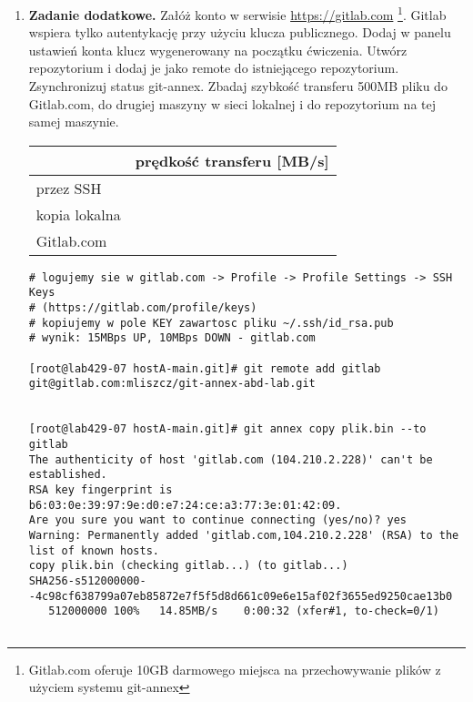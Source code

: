 \documentclass[polish]{article}
\newif\ifteacher
\begin{document}
\begin{enumerate}
\begin{lstlisting}[frame=single, caption=Wynik]
Only 1 of 2 trustworthy copies exist of plik.bin
Back it up with git-annex copy.
failed
(Recording state in git...)
git-annex: fsck: 1 failed

hostB-main.git$ git annex get --auto plik.bin
get plik.bin (from hostA-main...) SHA256-s512000000--4c98cf638799a07eb85872e7f5f5d8d661c09e6e15af02f3655ed9250cae13b0
512000000 100\% 45.54MB/s 0:00:10 (xfer#1, to-check=0/1)

sent 30 bytes received 512062649 bytes 44527189.48 bytes/sec
total size is 512000000 speedup is 1.00
ok
(Recording state in git...)
    \end{lstlisting}
\fi

    \item
    \textbf{Zadanie dodatkowe.} Załóż konto w serwisie
    \href{https://gitlab.com}{https://gitlab.com}
    \footnote{Gitlab.com oferuje 10GB darmowego miejsca na przechowywanie
    plików z użyciem systemu git-annex}.
    Gitlab wspiera tylko autentykację przy użyciu klucza publicznego. Dodaj
    w panelu ustawień konta klucz wygenerowany na początku ćwiczenia.
    Utwórz repozytorium i dodaj je jako remote do istniejącego repozytorium.
    Zsynchronizuj status git-annex. Zbadaj szybkość transferu 500MB pliku do
    Gitlab.com, do drugiej maszyny w sieci lokalnej i do repozytorium na tej
    samej maszynie.

    \begin{tabular}{|l|p{}|}
    \hline
    & prędkość transferu [MB/s] \\
    \hline
    przez SSH & \\
    \hline
    kopia lokalna & \\
    \hline
    Gitlab.com & \\
    \hline
    \end{tabular}

\ifteacher
    \begin{lstlisting}[frame=single, caption=Wynik]
# logujemy sie w gitlab.com -> Profile -> Profile Settings -> SSH Keys
# (https://gitlab.com/profile/keys)
# kopiujemy w pole KEY zawartosc pliku ~/.ssh/id_rsa.pub
# wynik: 15MBps UP, 10MBps DOWN - gitlab.com

[root@lab429-07 hostA-main.git]# git remote add gitlab git@gitlab.com:mliszcz/git-annex-abd-lab.git


[root@lab429-07 hostA-main.git]# git annex copy plik.bin --to gitlab
The authenticity of host 'gitlab.com (104.210.2.228)' can't be established.
RSA key fingerprint is b6:03:0e:39:97:9e:d0:e7:24:ce:a3:77:3e:01:42:09.
Are you sure you want to continue connecting (yes/no)? yes
Warning: Permanently added 'gitlab.com,104.210.2.228' (RSA) to the list of known hosts.
copy plik.bin (checking gitlab...) (to gitlab...)
SHA256-s512000000--4c98cf638799a07eb85872e7f5f5d8d661c09e6e15af02f3655ed9250cae13b0
   512000000 100%   14.85MB/s    0:00:32 (xfer#1, to-check=0/1)


\end{lstlisting}
\end{enumerate}
\end{document}
